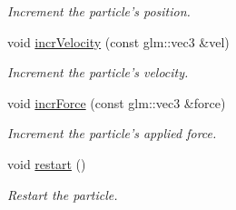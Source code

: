 \begin{DoxyCompactItemize}
\begin{DoxyCompactList}\small\item\em Increment the particle's position. \end{DoxyCompactList}\item 
void \hyperlink{classParticle_a281ec390b081eedb09324b82bf2051f9}{incr\+Velocity} (const glm\+::vec3 \&vel)
\begin{DoxyCompactList}\small\item\em Increment the particle's velocity. \end{DoxyCompactList}\item 
void \hyperlink{classParticle_ac78ce769340d2362374f29f5805cc796}{incr\+Force} (const glm\+::vec3 \&force)
\begin{DoxyCompactList}\small\item\em Increment the particle's applied force. \end{DoxyCompactList}\item 
void \hyperlink{classParticle_aa850ffa01940b79df28fb1cd9f68bf45}{restart} ()
\begin{DoxyCompactList}\small\item\em Restart the particle. \end{DoxyCompactList}\end{DoxyCompactItemize}
